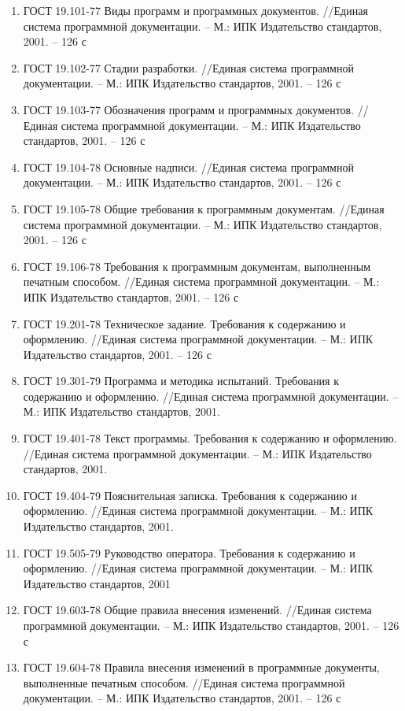 \documentclass{../TechDoc}
\begin{document}
    \begin{enumerate}
        \item ГОСТ 19.101-77 Виды программ и программных документов. //Единая система программной документации. – М.: ИПК Издательство стандартов, 2001. – 126 с
        \item ГОСТ 19.102-77 Стадии разработки. //Единая система программной документации. – М.: ИПК Издательство стандартов, 2001. – 126 с
        \item ГОСТ 19.103-77 Обозначения программ и программных документов. //Единая система программной документации. – М.: ИПК Издательство стандартов, 2001. – 126 с
        \item ГОСТ 19.104-78 Основные надписи. //Единая система программной документации. – М.: ИПК Издательство стандартов, 2001. – 126 с
        \item ГОСТ 19.105-78 Общие требования к программным документам. //Единая система программной документации. – М.: ИПК Издательство стандартов, 2001. – 126 с
        \item ГОСТ 19.106-78 Требования к программным документам, выполненным печатным способом. //Единая система программной документации. – М.: ИПК Издательство стандартов, 2001. – 126 с
        \item ГОСТ 19.201-78 Техническое задание. Требования к содержанию и оформлению. //Единая система программной документации. – М.: ИПК Издательство стандартов, 2001. – 126 с
        \item ГОСТ 19.301-79 Программа и методика испытаний. Требования к содержанию и оформлению. //Единая система программной документации. – М.: ИПК Издательство стандартов, 2001.
        \item ГОСТ 19.401-78 Текст программы. Требования к содержанию и оформлению. //Единая система программной документации. – М.: ИПК Издательство стандартов, 2001.
        \item ГОСТ 19.404-79 Пояснительная записка. Требования к содержанию и оформлению. //Единая система программной документации. – М.: ИПК Издательство стандартов, 2001.
        \item ГОСТ 19.505-79 Руководство оператора. Требования к содержанию и оформлению. //Единая система программной документации. – М.: ИПК Издательство стандартов, 2001
        \item ГОСТ 19.603-78 Общие правила внесения изменений. //Единая система программной документации. – М.: ИПК Издательство стандартов, 2001. – 126 с
        \item ГОСТ 19.604-78 Правила внесения изменений в программные документы, выполненные печатным способом. //Единая система программной документации. – М.: ИПК Издательство стандартов, 2001. – 126 с
    \end{enumerate}

    \clearpage

    \registrationList
        
\end{document}
